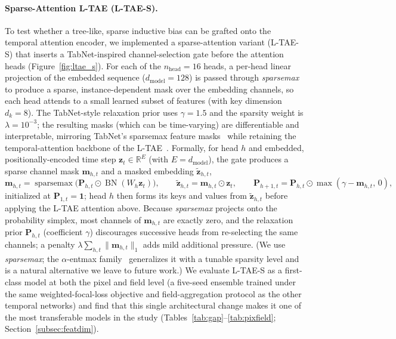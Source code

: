 \documentclass[pdflatex,sn-mathphys]{sn-jnl} %
\begin{document}
\paragraph{Sparse-Attention L-TAE (L-TAE-S).}

To test whether a tree-like, sparse inductive bias can be grafted onto the temporal
attention encoder, we implemented a sparse-attention variant (L-TAE-S) that inserts a
TabNet-inspired channel-selection gate before the attention heads (Figure~\ref{fig:ltae_s}). For each of the
$n_{\text{head}}=16$ heads, a per-head linear projection of the embedded sequence
($d_{\text{model}}=128$) is passed through \emph{sparsemax}~\cite{sparsemax2016} to
produce a sparse, instance-dependent mask over the embedding channels, so each head
attends to a small learned subset of features (with key dimension $d_k=8$). The
TabNet-style relaxation prior uses $\gamma=1.5$ and the sparsity weight is
$\lambda=10^{-3}$; the resulting masks (which can be time-varying) are differentiable and
interpretable, mirroring TabNet's sparsemax feature masks~\cite{tabnet_orig} while
retaining the temporal-attention backbone of the L-TAE~\cite{ltae2020}.
Formally, for head $h$ and embedded, positionally-encoded time step
$\mathbf{z}_t\in\mathbb{R}^{E}$ (with $E=d_{\text{model}}$), the gate produces a sparse
channel mask $\mathbf{m}_{h,t}$ and a masked embedding $\tilde{\mathbf{z}}_{h,t}$,
\[
  \mathbf{m}_{h,t}=\operatorname{sparsemax}\!\big(\mathbf{P}_{h,t}\odot
    \operatorname{BN}(W_h\mathbf{z}_t)\big),\qquad
  \tilde{\mathbf{z}}_{h,t}=\mathbf{m}_{h,t}\odot\mathbf{z}_t,\qquad
  \mathbf{P}_{h+1,t}=\mathbf{P}_{h,t}\odot\max(\gamma-\mathbf{m}_{h,t},\,0),
\]
initialized at $\mathbf{P}_{1,t}=\mathbf{1}$; head $h$ then forms its keys and values from
$\tilde{\mathbf{z}}_{h,t}$ before applying the L-TAE attention above. Because
\emph{sparsemax} projects onto the probability simplex, most channels of
$\mathbf{m}_{h,t}$ are exactly zero, and the relaxation prior $\mathbf{P}_{h,t}$
(coefficient $\gamma$) discourages successive heads from re-selecting the same channels;
a penalty $\lambda\sum_{h,t}\lVert\mathbf{m}_{h,t}\rVert_{1}$ adds mild additional
pressure. (We use
\emph{sparsemax}; the $\alpha$-entmax family~\cite{entmax2019} generalizes it with a
tunable sparsity level and is a natural alternative we leave to future work.) We evaluate
L-TAE-S as a first-class model at both the pixel and field level (a five-seed ensemble
trained under the same weighted-focal-loss objective and field-aggregation protocol as the
other temporal networks) and find that this single architectural change makes it one of
the most transferable models in the study (Tables~\ref{tab:gap}--\ref{tab:pixfield};
Section~\ref{subsec:featdim}).
\end{document}
